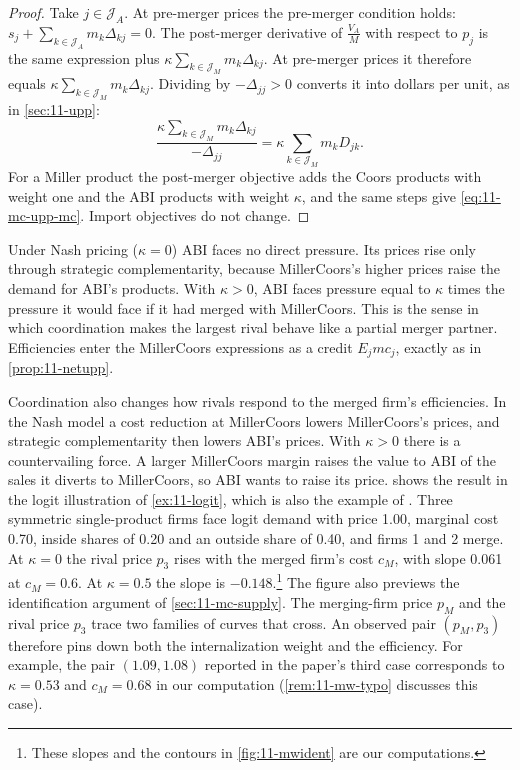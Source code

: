 \begin{proof}
Take $j \in \mathcal{J}_A$. At pre-merger prices the pre-merger condition holds:
$s_j + \sum_{k \in \mathcal{J}_A} m_k \Delta_{kj} = 0$. The post-merger derivative of $\frac{V_A}{M}$ with respect to
$p_j$ is the same expression plus $\kappa\sum_{k \in \mathcal{J}_M} m_k \Delta_{kj}$. At pre-merger prices it therefore
equals $\kappa\sum_{k\in\mathcal{J}_M} m_k\Delta_{kj}$. Dividing by $-\Delta_{jj} > 0$ converts it into dollars per
unit, as in \cref{sec:11-upp}:
\begin{equation*}
  \frac{\kappa\sum_{k\in\mathcal{J}_M} m_k\Delta_{kj}}{-\Delta_{jj}} = \kappa\sum_{k\in\mathcal{J}_M} m_k D_{jk}.
\end{equation*}
For a Miller product the post-merger objective adds the Coors products with weight one and the ABI products with
weight $\kappa$, and the same steps give \eqref{eq:11-mc-upp-mc}. Import objectives do not change.
\end{proof}

Under Nash pricing ($\kappa = 0$) ABI faces no direct pressure. Its prices rise only through strategic
complementarity, because MillerCoors's higher prices raise the demand for ABI's products. With $\kappa > 0$, ABI
faces pressure equal to $\kappa$ times the pressure it would face if it had merged with MillerCoors. This is the
sense in which coordination makes the largest rival behave like a partial merger partner. Efficiencies enter the
MillerCoors expressions as a credit $E_j mc_j$, exactly as in \cref{prop:11-netupp}.

Coordination also changes how rivals respond to the merged firm's efficiencies. In the Nash model a cost reduction at
MillerCoors lowers MillerCoors's prices, and strategic complementarity then lowers ABI's prices. With $\kappa > 0$
there is a countervailing force. A larger MillerCoors margin raises the value to ABI of the sales it diverts to
MillerCoors, so ABI wants to raise its price.  shows the result in the logit illustration of
\cref{ex:11-logit}, which is also the example of \citet[p.~1780]{MillerWeinberg2017}. Three symmetric single-product
firms face logit demand with price 1.00, marginal cost 0.70, inside shares of 0.20 and an outside share of 0.40, and
firms 1 and 2 merge. At $\kappa = 0$ the rival price $p_3$ rises with the merged firm's cost $c_M$, with slope 0.061 at
$c_M = 0.6$. At $\kappa = 0.5$ the slope is $-0.148$.\footnote{These slopes and the contours in
\cref{fig:11-mwident} are our computations.} The figure also
previews the identification argument of \cref{sec:11-mc-supply}. The merging-firm price $p_M$ and the rival price
$p_3$ trace two families of curves that cross. An observed pair $(p_M, p_3)$ therefore pins down both the
internalization weight and the efficiency. For example, the pair $(1.09, 1.08)$ reported in the paper's third case
corresponds to $\kappa = 0.53$ and $c_M = 0.68$ in our computation (\cref{rem:11-mw-typo} discusses this case).

